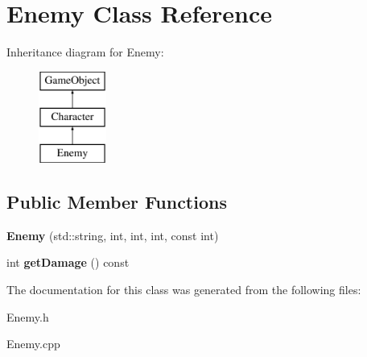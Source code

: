 \hypertarget{class_enemy}{}\section{Enemy Class Reference}
\label{class_enemy}
Inheritance diagram for Enemy\+:\begin{figure}[H]
\begin{center}
\leavevmode
\includegraphics[height=3.000000cm]{class_enemy}
\end{center}
\end{figure}
\subsection*{Public Member Functions}
\begin{DoxyCompactItemize}
\item 
\mbox{\label{class_enemy_af847b3e65f5845b7894bc514ca47174b}} 
{\bfseries Enemy} (std\+::string, int, int, int, const int)
\item 
\mbox{\label{class_enemy_abb68708af5f493bee8516d1dce35797e}} 
int {\bfseries get\+Damage} () const
\end{DoxyCompactItemize}


The documentation for this class was generated from the following files\+:\begin{DoxyCompactItemize}
\item 
Enemy.\+h\item 
Enemy.\+cpp\end{DoxyCompactItemize}
